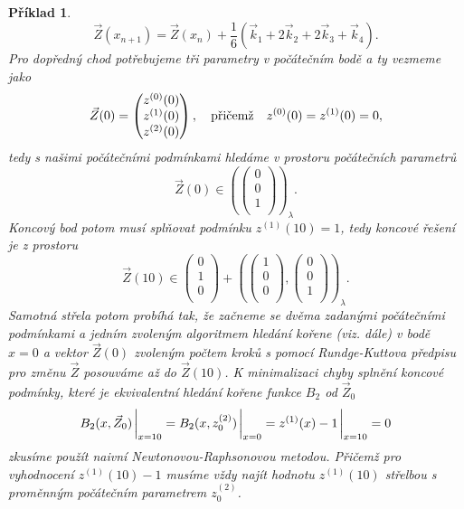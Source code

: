 \documentclass{article}
\newtheorem{example}{Příklad}
\begin{document}
\begin{example}
\begin{equation}
		\vec{Z}(x_{n+1}) = \vec{Z}(x_{n}) + \frac{1}{6}  \left(\vec{k}_{1} +  2\vec{k}_{2} + 2\vec{k}_{3} + \vec{k}_{4} \right).
	\end{equation}
	Pro dopředný chod potřebujeme tři parametry v počátečním bodě a ty vezmeme jako
	\begin{equation}
		\vec{Z}(0) =
		\begin{pmatrix}
			z^{(0)}(0) \\
			z^{(1)}(0) \\
			z^{(2)}(0)
		\end{pmatrix},  \qq{přičemž} z^{(0)}(0) = z^{(1)}(0) = 0,
	\end{equation}
	tedy s našimi počátečními podmínkami hledáme v prostoru počátečních parametrů
	\begin{equation}
		\vec{Z}(0) \in \left(
		\begin{pmatrix}
			0 \\
			0 \\
			1 \\
		\end{pmatrix}
		\right)_{\lambda}.
	\end{equation}
	Koncový bod potom musí splňovat podmínku $z^{(1)}(10) = 1$, tedy koncové řešení je z prostoru
	\begin{equation}
		\vec{Z}(10) \in
		\begin{pmatrix}
			0 \\
			1 \\
			0 \\
		\end{pmatrix}  +
		\left(
		\begin{pmatrix}
			1 \\
			0 \\
			0 \\
		\end{pmatrix},
		\begin{pmatrix}
			0 \\
			0 \\
			1 \\
		\end{pmatrix}
		\right)_{\lambda}.
	\end{equation}
	Samotná střela potom probíhá tak, že začneme se dvěma zadanými počátečními podmínkami a jedním zvoleným algoritmem hledání kořene (viz. dále) v bodě $x = 0$ a vektor $\vec{Z}(0)$ zvoleným počtem kroků s pomocí Rundge-Kuttova předpisu pro změnu $\vec{Z}$ posouváme až do $\vec{Z}(10)$.
	\medskip
	K minimalizaci chyby splnění koncové podmínky, které je ekvivalentní hledání kořene funkce $B_{2}$ od $\vec{Z}_{0}$
	\begin{equation}
		B_{2}(x, \vec{Z}_{0}) \eval_{x = 10}= B_{2}(x, z^{(2)}_{0}) \eval_{x=0}= z^{(1)}(x) - 1 \eval_{x=10}= 0
	\end{equation}
	zkusíme použít naivní Newtonovou-Raphsonovou metodou. Přičemž pro vyhodnocení $z^{(1)}(10) - 1$ musíme vždy najít hodnotu $z^{(1)}(10)$ střelbou s proměnným počátečním parametrem $z^{(2)}_{0}$.


\end{example}
\end{document}
